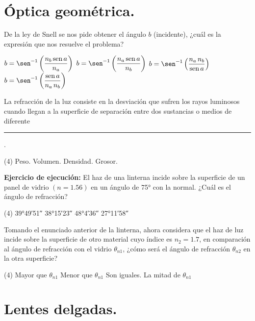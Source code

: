 \documentclass[12pt, letter]{exam}
\begin{document}
\begin{questions}
    \section{Óptica geométrica.}

    \question De la ley de Snell se nos pide obtener el ángulo $b$ (incidente), ¿cuál es la expresión que nos resuelve el problema?
    \begin{tasks}
        \task $ b = \sen^{-1} \left(\dfrac{n_{b} \, \text{sen} \, a}{n_{a}} \right)$
        \task $ b = \sen^{-1} \left(\dfrac{n_{a} \, \text{sen} \, a}{n_{b}} \right)$
        \task $ b = \sen^{-1} \left(\dfrac{n_{a} \, n_{b}}{\text{sen} \, a} \right)$
        \task $ b = \sen^{-1} \left(\dfrac{\text{sen} \, a}{n_{a} \, n_{b}} \right)$
    \end{tasks}
    \question La refracción de la luz consiste en la desviación que sufren los rayos luminosos cuando llegan a la superficie de separación entre dos sustancias o medios de diferente \rule{2.5cm}{0.1mm}.
    \begin{tasks}(4)
        \task Peso.
        \task Volumen.
        \task Densidad.
        \task Grosor.
    \end{tasks}
    \question \label{Problema_01} \textbf{Ejercicio de ejecución: } El haz de una linterna incide sobre la superficie de un panel de vidrio $(n = 1.56)$ en un ángulo de \ang{75} con la normal. ¿Cuál es el ángulo de refracción?
    \begin{tasks}(4)
        \task \ang{39;49;51}
        \task \ang{38;15;23}
        \task \ang{48;4;36}
        \task \ang{27;11;58}
    \end{tasks}
    \question Tomando el enunciado anterior de la linterna, ahora considera que el haz de luz incide sobre la superficie de otro material cuyo índice es $n_{2} = 1.7$, en comparación al ángulo de refracción con el vidrio $\theta_{n1}$, ¿cómo será el ángulo de refracción $\theta_{n2}$ en la otra superficie?
    \begin{tasks}(4)
        \task Mayor que $\theta_{n1}$
        \task Menor que $\theta_{n1}$
        \task Son iguales.
        \task La mitad de $\theta_{n1}$
    \end{tasks}
    

    \section{Lentes delgadas.}


\end{questions}
\end{document}
